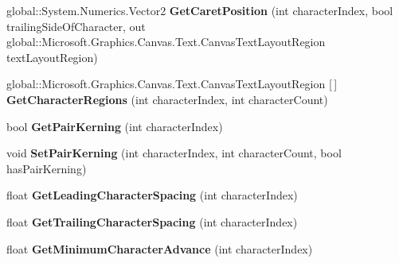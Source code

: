 \begin{DoxyCompactItemize}
global\+::\+System.\+Numerics.\+Vector2 {\bfseries Get\+Caret\+Position} (int character\+Index, bool trailing\+Side\+Of\+Character, out global\+::\+Microsoft.\+Graphics.\+Canvas.\+Text.\+Canvas\+Text\+Layout\+Region text\+Layout\+Region)
\item 
\mbox{\label{interface_microsoft_1_1_graphics_1_1_canvas_1_1_text_1_1_i_canvas_text_layout_a9ce2304a76b40116670a355bc5982d5b}} 
global\+::\+Microsoft.\+Graphics.\+Canvas.\+Text.\+Canvas\+Text\+Layout\+Region \mbox{[}$\,$\mbox{]} {\bfseries Get\+Character\+Regions} (int character\+Index, int character\+Count)
\item 
\mbox{\label{interface_microsoft_1_1_graphics_1_1_canvas_1_1_text_1_1_i_canvas_text_layout_aad1825e0663c1f7846a93a175cf888e5}} 
bool {\bfseries Get\+Pair\+Kerning} (int character\+Index)
\item 
\mbox{\label{interface_microsoft_1_1_graphics_1_1_canvas_1_1_text_1_1_i_canvas_text_layout_a20aaafcf4e028122cfc8726b8fbc1f5b}} 
void {\bfseries Set\+Pair\+Kerning} (int character\+Index, int character\+Count, bool has\+Pair\+Kerning)
\item 
\mbox{\label{interface_microsoft_1_1_graphics_1_1_canvas_1_1_text_1_1_i_canvas_text_layout_addf54ecd9d5f689e2f22514aabe8c42e}} 
float {\bfseries Get\+Leading\+Character\+Spacing} (int character\+Index)
\item 
\mbox{\label{interface_microsoft_1_1_graphics_1_1_canvas_1_1_text_1_1_i_canvas_text_layout_a199bf5969708e06675546b0d7f97c609}} 
float {\bfseries Get\+Trailing\+Character\+Spacing} (int character\+Index)
\item 
\mbox{\label{interface_microsoft_1_1_graphics_1_1_canvas_1_1_text_1_1_i_canvas_text_layout_a9b50d894550f524f46294a3b5e626497}} 
float {\bfseries Get\+Minimum\+Character\+Advance} (int character\+Index)

\end{DoxyCompactItemize}
